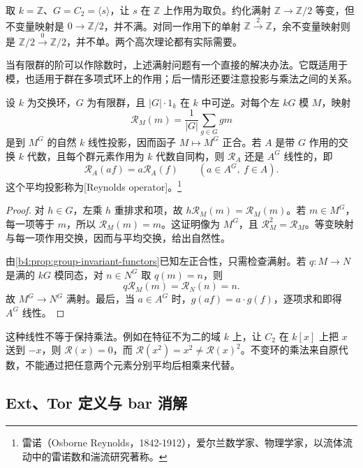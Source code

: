 取 \(k=\mathbb Z\)、\(G=C_2=\langle s\rangle\)，让 \(s\) 在 \(\mathbb Z\) 上作用为取负。约化满射 \(\mathbb Z\to\mathbb Z/2\) 等变，但不变量映射是 \(0\to\mathbb Z/2\)，并不满。对同一作用下的单射 \(\mathbb Z\xrightarrow{2}\mathbb Z\)，余不变量映射则是 \(\mathbb Z/2\xrightarrow{0}\mathbb Z/2\)，并不单。两个高次理论都有实际需要。

\ProseParagraphBreak
当有限群的阶可以作除数时，上述满射问题有一个直接的解决办法。它既适用于模，也适用于群在多项式环上的作用；后一情形还要注意投影与乘法之间的关系。

\begin{proposition}\label{b4:prop:reynolds-exactness}
设 \(k\) 为交换环，\(G\) 为有限群，且 \(|G|\cdot1_k\) 在 \(k\) 中可逆。对每个左 \(kG\) 模 \(M\)，映射
\[
\mathcal R_M(m)=\frac1{|G|}\sum_{g\in G}gm
\]
是到 \(M^G\) 的自然 \(k\) 线性投影，因而函子 \(M\mapsto M^G\) 正合。若 \(A\) 是带 \(G\) 作用的交换 \(k\) 代数，且每个群元素作用为 \(k\) 代数自同构，则 \(\mathcal R_A\) 还是 \(A^G\) 线性的，即
\[
\mathcal R_A(af)=a\mathcal R_A(f)
\qquad(a\in A^G,\ f\in A).
\]
这个平均投影称为[Reynolds operator]。\footnote{雷诺（Osborne Reynolds，1842-1912），爱尔兰数学家、物理学家，以流体流动中的雷诺数和湍流研究著称。}
\end{proposition}
\begin{proof}
对 \(h\in G\)，左乘 \(h\) 重排求和项，故 \(h\mathcal R_M(m)=\mathcal R_M(m)\)。若 \(m\in M^G\)，每一项等于 \(m\)，所以 \(\mathcal R_M(m)=m\)。这证明像为 \(M^G\)，且 \(\mathcal R_M^2=\mathcal R_M\)。等变映射与每一项作用交换，因而与平均交换，给出自然性。

由\cref{b4:prop:group-invariant-functors}已知左正合性，只需检查满射。若 \(q:M\to N\) 是满的 \(kG\) 模同态，对 \(n\in N^G\) 取 \(q(m)=n\)，则
\[
q\mathcal R_M(m)=\mathcal R_N(n)=n.
\]
故 \(M^G\to N^G\) 满射。最后，当 \(a\in A^G\) 时，\(g(af)=a\cdot g(f)\)，逐项求和即得 \(A^G\) 线性。
\end{proof}

这种线性不等于保持乘法。例如在特征不为二的域 \(k\) 上，让 \(C_2\) 在 \(k[x]\) 上把 \(x\) 送到 \(-x\)，则 \(\mathcal R(x)=0\)，而 \(\mathcal R(x^2)=x^2\ne\mathcal R(x)^2\)。不变环的乘法来自原代数，不能通过把任意两个元素分别平均后相乘来代替。

\subsection{Ext、Tor 定义与 bar 消解}
\label{b4:subsec:1101:02}

